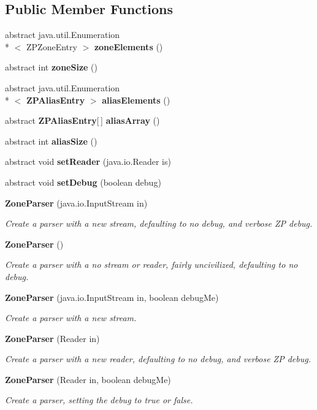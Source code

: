 \subsection*{Public Member Functions}
\begin{DoxyCompactItemize}
\item 
abstract java.\+util.\+Enumeration\\*
$<$ Z\+P\+Zone\+Entry $>$ {\bf zone\+Elements} ()
\item 
abstract int {\bf zone\+Size} ()
\item 
abstract java.\+util.\+Enumeration\\*
$<$ {\bf Z\+P\+Alias\+Entry} $>$ {\bf alias\+Elements} ()
\item 
abstract {\bf Z\+P\+Alias\+Entry}[$\,$] {\bf alias\+Array} ()
\item 
abstract int {\bf alias\+Size} ()
\item 
abstract void {\bf set\+Reader} (java.\+io.\+Reader is)
\item 
abstract void {\bf set\+Debug} (boolean debug)
\item 
{\bf Zone\+Parser} (java.\+io.\+Input\+Stream in)
\begin{DoxyCompactList}\small\item\em Create a parser with a new stream, defaulting to no debug, and verbose Z\+P debug. \end{DoxyCompactList}\item 
{\bf Zone\+Parser} ()
\begin{DoxyCompactList}\small\item\em Create a parser with a no stream or reader, fairly uncivilized, defaulting to no debug. \end{DoxyCompactList}\item 
{\bf Zone\+Parser} (java.\+io.\+Input\+Stream in, boolean debug\+Me)
\begin{DoxyCompactList}\small\item\em Create a parser with a new stream. \end{DoxyCompactList}\item 
{\bf Zone\+Parser} (Reader in)
\begin{DoxyCompactList}\small\item\em Create a parser with a new reader, defaulting to no debug, and verbose Z\+P debug. \end{DoxyCompactList}\item 
{\bf Zone\+Parser} (Reader in, boolean debug\+Me)
\begin{DoxyCompactList}\small\item\em Create a parser, setting the debug to true or false. \end{DoxyCompactList}\item 

\end{DoxyCompactItemize}
